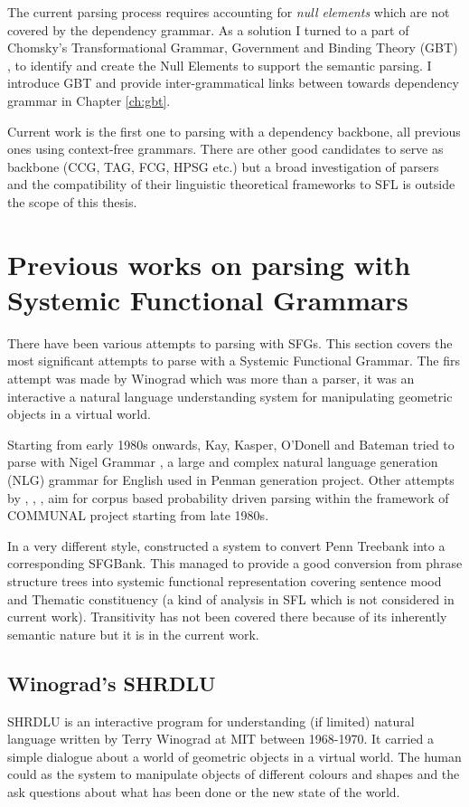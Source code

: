 The current parsing process requires accounting for \textit{null elements} which are not covered by the dependency  grammar. As a solution I turned to a part of Chomsky's Transformational Grammar\citep{Chomsky1957}, Government and Binding Theory (GBT) \citep{Chomsky81,Haegeman1991}, to identify and create the Null Elements to support the semantic parsing. I introduce GBT and provide inter-grammatical links between towards dependency grammar in Chapter \ref{ch:gbt}.

Current work is the first one to parsing with a dependency backbone, all previous ones using context-free grammars. 
There are other good candidates to serve as backbone (CCG, TAG, FCG, HPSG etc.) but a broad investigation of parsers and the compatibility of their linguistic theoretical frameworks to SFL is outside the scope of this thesis. 

\section{Previous works on parsing with Systemic Functional Grammars}
\label{sec:sota-old}
There have been various attempts to parsing with SFGs. This section covers the most significant attempts to parse with a Systemic Functional Grammar. The firs attempt was made by Winograd \citep{Winograd1972} which was more than a parser, it was an interactive a natural language understanding system for manipulating geometric objects in a virtual world.

Starting from early 1980s onwards, Kay, Kasper, O'Donell and Bateman tried to parse with Nigel Grammar \citep{Matthiessen1985}, a large and complex natural language generation (NLG) grammar for English used in Penman generation project. Other attempts by \citet{ODonoghue1991a}, \citet{Weerasinghe1994}, \citet{Souter1996}, \citet{Day2007} aim for corpus based probability driven parsing within the framework of COMMUNAL project starting from late 1980s.

In a very different style, \citet{Honnibal2004a,Honnibal2007} constructed a system to convert Penn Treebank into a corresponding SFGBank. This managed to provide a good conversion from phrase structure trees into systemic functional representation covering sentence mood and Thematic constituency (a kind of analysis in SFL which is not considered in current work). Transitivity has not been covered there because of its inherently semantic nature but it is in the current work.

\subsection{Winograd's SHRDLU}
SHRDLU is an interactive program for understanding (if limited) natural language written by Terry Winograd at MIT between 1968-1970. It carried a simple dialogue about a world of geometric objects in a virtual world. The human could as the system to manipulate objects of different colours and shapes and the ask questions about what has been done or the new state of the world. 

